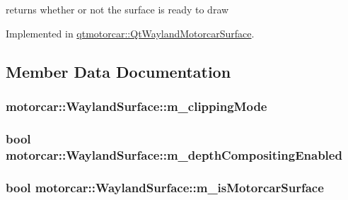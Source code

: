 returns whether or not the surface is ready to draw 



Implemented in \hyperlink{classqtmotorcar_1_1QtWaylandMotorcarSurface_a3bea85a2a6a3079e60c3b37dd08aebc6}{qtmotorcar\-::\-Qt\-Wayland\-Motorcar\-Surface}.



\subsection{Member Data Documentation}
\hypertarget{classmotorcar_1_1WaylandSurface_a17668113470d8907fa0c6ef84758f828}{
\subsubsection[{m\-\_\-clipping\-Mode}]{ motorcar\-::\-Wayland\-Surface\-::m\-\_\-clipping\-Mode\hspace{0.3cm}{\ttfamily [protected]}}}\label{classmotorcar_1_1WaylandSurface_a17668113470d8907fa0c6ef84758f828}
\hypertarget{classmotorcar_1_1WaylandSurface_ae3f67aa2ac9bf4d7ebf54ada6b9152d0}{
\subsubsection[{m\-\_\-depth\-Compositing\-Enabled}]{\setlength{\rightskip}{0pt plus 5cm}bool motorcar\-::\-Wayland\-Surface\-::m\-\_\-depth\-Compositing\-Enabled\hspace{0.3cm}{\ttfamily [protected]}}}\label{classmotorcar_1_1WaylandSurface_ae3f67aa2ac9bf4d7ebf54ada6b9152d0}
\hypertarget{classmotorcar_1_1WaylandSurface_a123a2705782ddf461ab615362dcaeb89}{
\subsubsection[{m\-\_\-is\-Motorcar\-Surface}]{\setlength{\rightskip}{0pt plus 5cm}bool motorcar\-::\-Wayland\-Surface\-::m\-\_\-is\-Motorcar\-Surface\hspace{0.3cm}{\ttfamily [protected]}}}\label{classmotorcar_1_1WaylandSurface_a123a2705782ddf461ab615362dcaeb89}
